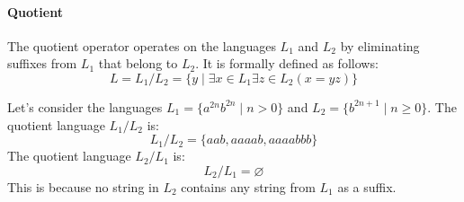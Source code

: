 \paragraph*{Quotient} 
The quotient operator operates on the languages $L_1$ and $L_2$ by eliminating suffixes from $L_1$ that belong to $L_2$. 
It is formally defined as follows:
\[L=L_1/L_2=\{y\mid\exists x \in L_1 \exists z \in L_2 (x=yz)\}\]
\begin{example}
    Let's consider the languages $L_1=\{a^{2n}b^{2n}\mid n>0\}$ and $L_2=\{b^{2n+1}\mid n \geq 0\}$. 
    The quotient language $L_1/L_2$ is:
    \[L_1/L_2=\{aab,aaaab,aaaabbb\}\]
    The quotient language $L_2/L_1$ is:
    \[L_2/L_1=\varnothing\]
    This is because no string in $L_2$ contains any string from $L_1$ as a suffix.
\end{example}